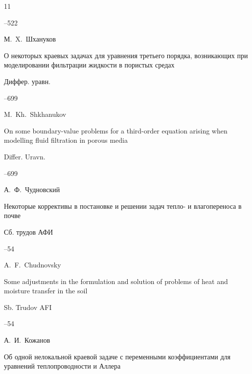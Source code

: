 {\begin{thebibliography}{11}


--522






\by М.~X.~Шхануков

\paper О некоторых краевых задачах для уравнения третьего порядка, возникающих при моделировании фильтрации жидкости в пористых средах

\jour Диффер. уравн.




--699

\misctransl

\by M.~Kh.~Shkhanukov

\paper On some boundary-value problems for a third-order equation arising when modelling fluid filtration in porous media

\jour Differ. Uravn.



–699 





\by А.~Ф.~Чудновский

\paper Некоторые коррективы в постановке и решении задач тепло- и влагопереноса в почве 

\jour  Сб. трудов АФИ



--54

\misctransl

\by A.~F.~Chudnovsky 

\paper Some adjustments in the formulation and solution of problems of heat and moisture transfer in the soil

\jour  Sb. Trudov AFI



--54




\by А.~И.~Кожанов

\paper Об одной нелокальной краевой задаче с переменными коэффициентами для уравнений теплопроводности и Аллера 


\end{thebibliography}}
